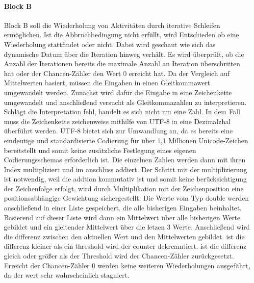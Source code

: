 \documentclass{article}
\begin{document}
    \\
    \textbf{Block B}\\
    \\
    Block B soll die Wiederholung von Aktivitäten durch iterative Schleifen ermöglichen.
    Ist die Abbruchbedingung nicht erfüllt, wird Entschieden ob eine Wiederholung stattfindet oder nicht. Dabei wird geschaut wie sich das dynamische Datum über die Iteration hinweg verhält.
    Es wird überprüft, ob die Anzahl der Iterationen bereits die maximale Anzahl an Iteration überschritten hat oder der Chancen-Zähler den Wert 0 erreicht hat.
    Da der Vergleich auf Mittelwerten basiert, müssen die Eingaben in einen Gleitkommawert umgewandelt werden.
    Zunächst wird dafür die Eingabe in eine Zeichenkette umgewandelt und anschließend versucht als Gleitkommazahlen zu interpretieren. 
    Schlägt die Interpretation fehl, handelt es sich nicht um eine Zahl. In dem Fall muss die Zeichenkette zeichenweise mithilfe von UTF-8 in eine Dezimalzhal überführt werden.     
    UTF-8 bietet sich zur Umwandlung an, da es bereits eine eindeutige und standardisierte Codierung für über 1,1 Millionen Unicode-Zeichen bereitstellt und somit keine zusätzliche Festlegung eines eigenen Codierungsschemas erforderlich ist.    
    Die einzelnen Zahlen werden dann mit ihren Index multipliziert und im anschluss addiert.
    Der Schritt mit der multiplizierung ist notwendig, weil die addtion kommutativ ist und somit keine berücksichtigung der Zeichenfolge erfolgt, wird durch Multiplikation mit der Zeichenposition eine positionsabhängige Gewichtung sichergestellt.
    Die Werte vom Typ double werden anschließend in einer Liste gespeichert, die alle bisherigen Eingaben beinhaltet.
    Basierend auf dieser Liste wird dann ein Mittelwert über alle bisherigen Werte gebildet und ein gleitender Mittelwert über die letzen 3 Werte.
    Anschließend wird die differenz zwischen den aktuellen Wert und den Mittelwerten gebildet. ist die differenz kleiner als ein threshold wird der counter dekremntiert. ist die differenz gleich oder größer als der Threshold wird der Chancen-Zähler zurückgesetzt.
    Erreicht der Chancen-Zähler 0 werden keine weiteren Wiederholungen ausgeführt, da der wert sehr wahrscheinlich stagniert.
\end{document}
